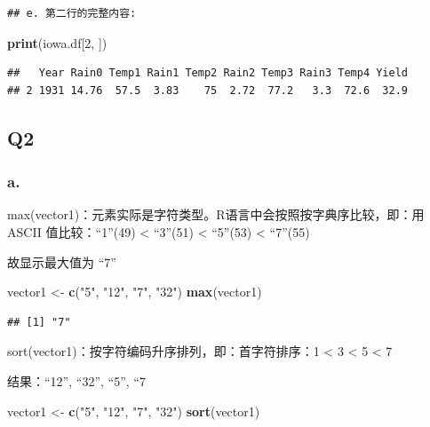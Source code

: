 \documentclass[
]{article}
\newenvironment{Shaded}{\begin{snugshade}}{\end{snugshade}}
\newcommand{\DecValTok}[1]{\textcolor[rgb]{0.00,0.00,0.81}{#1}}
\newcommand{\FunctionTok}[1]{\textcolor[rgb]{0.13,0.29,0.53}{\textbf{#1}}}
\newcommand{\NormalTok}[1]{#1}
\newcommand{\OtherTok}[1]{\textcolor[rgb]{0.56,0.35,0.01}{#1}}
\newcommand{\StringTok}[1]{\textcolor[rgb]{0.31,0.60,0.02}{#1}}
\begin{document}
\begin{verbatim}
## e. 第二行的完整内容:
\end{verbatim}

\begin{Shaded}
\begin{Highlighting}[]
\FunctionTok{print}\NormalTok{(iowa.df[}\DecValTok{2}\NormalTok{, ])}
\end{Highlighting}
\end{Shaded}

\begin{verbatim}
##   Year Rain0 Temp1 Rain1 Temp2 Rain2 Temp3 Rain3 Temp4 Yield
## 2 1931 14.76  57.5  3.83    75  2.72  77.2   3.3  72.6  32.9
\end{verbatim}

\subsection{Q2}\label{q2}

\subsubsection{a.}\label{a.-1}

max(vector1)：元素实际是字符类型。R语言中会按照按字典序比较，即：用ASCII
值比较：``1''(49) \textless{} ``3''(51) \textless{} ``5''(53)
\textless{} ``7''(55)

故显示最大值为 ``7''

\begin{Shaded}
\begin{Highlighting}[]
\NormalTok{ vector1 }\OtherTok{\textless{}{-}} \FunctionTok{c}\NormalTok{(}\StringTok{"5"}\NormalTok{, }\StringTok{"12"}\NormalTok{, }\StringTok{"7"}\NormalTok{, }\StringTok{"32"}\NormalTok{)}
 \FunctionTok{max}\NormalTok{(vector1)}
\end{Highlighting}
\end{Shaded}

\begin{verbatim}
## [1] "7"
\end{verbatim}

sort(vector1)：按字符编码升序排列，即：首字符排序：1 \textless{} 3
\textless{} 5 \textless{} 7

结果：``12'', ``32'', ``5'', ``7

\begin{Shaded}
\begin{Highlighting}[]
\NormalTok{ vector1 }\OtherTok{\textless{}{-}} \FunctionTok{c}\NormalTok{(}\StringTok{"5"}\NormalTok{, }\StringTok{"12"}\NormalTok{, }\StringTok{"7"}\NormalTok{, }\StringTok{"32"}\NormalTok{)}
 \FunctionTok{sort}\NormalTok{(vector1)}
\end{Highlighting}
\end{Shaded}
\end{document}
